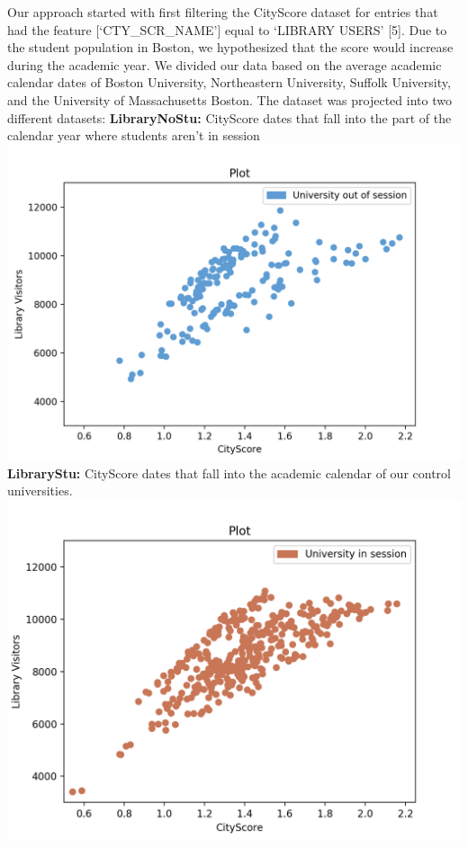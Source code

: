 \documentclass[journal, a4paper]{IEEEtran}
\begin{document}
Our approach started with first filtering the CityScore dataset for entries that had the feature  [‘CTY\_SCR\_NAME’]  equal to ‘LIBRARY USERS’ [5]. Due to the student population in Boston, we hypothesized that the score would increase during the academic year. We divided our data based on the average academic calendar dates of Boston University, Northeastern University, Suffolk University, and the University of Massachusetts Boston. The dataset was projected into two different datasets:
\newline
\newline 
\textbf{LibraryNoStu:}
\newline
CityScore dates that fall into the part of the calendar year where students aren’t in session 
\newline 
\includegraphics[width=\columnwidth]{noUniv.png}
\newline
\textbf{LibraryStu:}
\newline
CityScore dates that fall into the academic calendar of our control universities. 
\newline 
\includegraphics[width=\columnwidth]{Univ.png}
\end{document}
